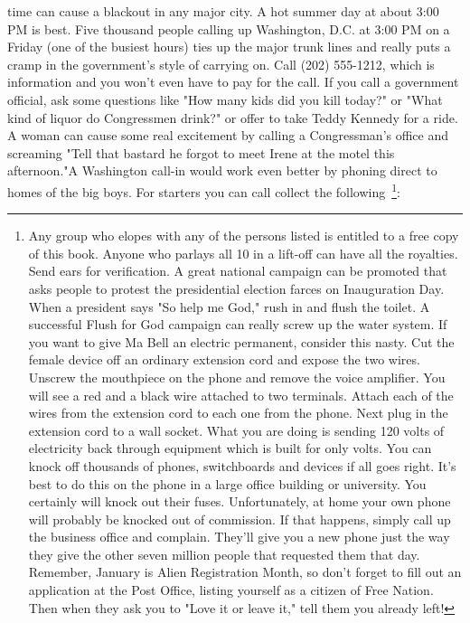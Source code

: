 \documentclass[11pt,twoside,a4paper]{book}
\begin{document}
time can cause a blackout in any major city. A hot summer day at about 3:00 PM is best. Five thousand people calling up Washington, D.C. at 3:00 PM on a Friday (one of the busiest hours) ties up the major trunk lines and really puts a cramp in the government's style of carrying on. Call (202) 555-1212, which is information and you won't even have to pay for the call. If you call a government official, ask some questions like "How many kids did you kill today?" or "What kind of liquor do Congressmen drink?" or offer to take Teddy Kennedy for a ride. A woman can cause some real excitement by calling a Congressman's office and screaming "Tell that bastard he forgot to meet Irene at the motel this afternoon."A Washington call-in would work even better by phoning direct to homes of the big boys. For starters you can call collect the following~\footnote{Any group who elopes with any of the persons listed is entitled to a free copy of this book. Anyone who parlays all 10 in a lift-off can have all the royalties. Send ears for verification. A great national campaign can be promoted that asks people to protest the presidential election farces on Inauguration Day. When a president says "So help me God," rush in and flush the toilet. A successful Flush for God campaign can really screw up the water system. If you want to give Ma Bell an electric permanent, consider this nasty. Cut the female device off an ordinary extension cord and expose the two wires. Unscrew the mouthpiece on the phone and remove the voice amplifier. You will see a red and a black wire  attached to two terminals. Attach each of the wires from the extension cord to each one from the phone. Next plug in the extension cord to a wall socket. What you are doing is sending 120 volts of electricity back through equipment which is built for only volts. You can knock off thousands of phones, switchboards and devices if all goes right. It's best to do this on the phone in a large office building or university. You certainly will knock out their fuses. Unfortunately, at home your own phone will probably be knocked out of commission. If that happens, simply call up the business office and complain. They'll give you a new phone just the way they give the other seven million people that requested them that day. Remember, January is Alien Registration Month, so don't forget to fill out an application at the Post Office, listing yourself as a citizen of Free Nation. Then when they ask you to "Love it or leave it," tell them you already left! }:
\end{document}
